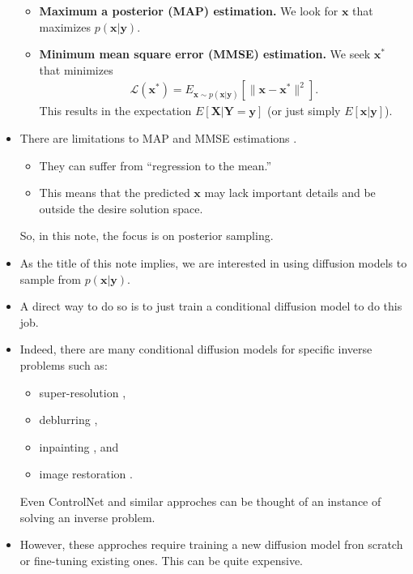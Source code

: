 \documentclass[10pt]{article}
\newcommand{\ve}[1]{\mathbf{#1}}
\newcommand{\mcal}[1]{\mathcal{#1}}
\begin{document}
\begin{itemize}
\begin{itemize}
    \item {\bf Maximum a posterior (MAP) estimation.} We look for $\ve{x}$ that maximizes $p(\ve{x}|\ve{y})$.
    
    \item {\bf Minimum mean square error (MMSE) estimation.} We seek $\ve{x}^*$ that minimizes
    \begin{align*}
      \mcal{L}(\ve{x}^*) = E_{\ve{x} \sim p(\ve{x}|\ve{y})} [\| \ve{x} - \ve{x}^* \|^2].
    \end{align*}
    This results in the expectation $E[\ve{X}|\ve{Y}=\ve{y}]$ (or just simply $E[\ve{x}|\ve{y}]$).
  \end{itemize}
  
  \item There are limitations to MAP and MMSE estimations \cite{Blau:2018, Delbracio:2024}.
  \begin{itemize}
    \item They can suffer from ``regression to the mean.''
    \item This means that the predicted $\ve{x}$ may lack important details and be outside the desire solution space.
  \end{itemize}
  So, in this note, the focus is on posterior sampling.

  \item As the title of this note implies, we are interested in using diffusion models to sample from $p(\ve{x}|\ve{y})$. 
  
  \item A direct way to do so is to just train a conditional diffusion model to do this job. 
  
  \item Indeed, there are many conditional diffusion models for specific inverse problems such as:
  \begin{itemize}
    \item super-resolution \cite{Li:SRDiff:2021, Saharia:2021}, 
    \item deblurring \cite{Whang:2021}, 
    \item inpainting \cite{Saharia:Palette:2022}, and 
    \item image restoration \cite{Saharia:Palette:2022, Luo:MRSDE:2023, Luo:Refusion:2023}.
  \end{itemize}  
  Even ControlNet \cite{Zhang:ControlNet:2023} and similar approches can be thought of an instance of solving an inverse problem. 
  
  \item However, these approches require training a new diffusion model fron scratch or fine-tuning existing ones. This can be quite expensive.
  

\end{itemize}
\end{document}
